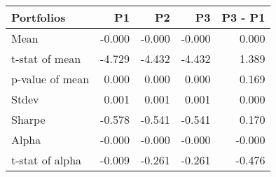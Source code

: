 \begin{tabular}{lrrrr}
\toprule
Portfolios & P1 & P2 & P3 & P3 - P1 \\
\midrule
Mean & -0.000 & -0.000 & -0.000 & 0.000 \\
t-stat of mean & -4.729 & -4.432 & -4.432 & 1.389 \\
p-value of mean & 0.000 & 0.000 & 0.000 & 0.169 \\
Stdev & 0.001 & 0.001 & 0.001 & 0.000 \\
Sharpe & -0.578 & -0.541 & -0.541 & 0.170 \\
Alpha & -0.000 & -0.000 & -0.000 & -0.000 \\
t-stat of alpha & -0.009 & -0.261 & -0.261 & -0.476 \\
\bottomrule
\end{tabular}
